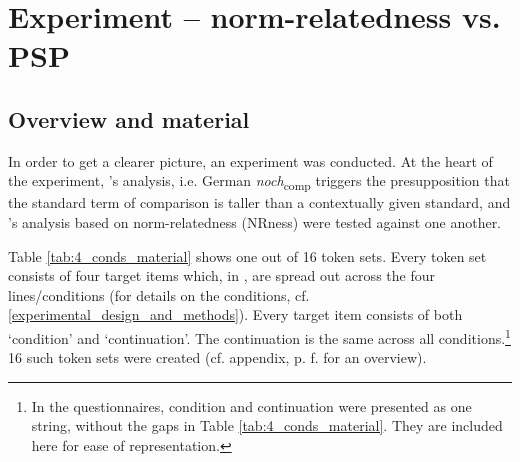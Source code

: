 \documentclass[output=paper,
modfonts
]{langscibook}
\begin{document}
\section{Experiment -- norm-relatedness vs. PSP}\label{sec_experiment}
\subsection{Overview and material}

In order to get a clearer picture, an experiment was conducted. At the heart of the experiment, \citeauthor{Hofstetter2013}'s \citeyearpar{Hofstetter2013} analysis, i.e. German \textit{noch}\textsubscript{comp} triggers the presupposition that the standard term of comparison is taller than a contextually given standard, and \citeauthor{umbach2009a_comp}'s \citeyearpar{umbach2009a_comp} analysis based on norm-relatedness (NRness) were tested against one another.

Table \ref{tab:4_conds_material} shows one out of 16 token sets. Every token set consists of four target items which, in , are spread out across the four lines/conditions (for details on the conditions, cf. \ref{experimental_design_and_methods}). Every target item consists of both `condition' and `continuation'. The continuation is the same across all conditions.\footnote{In the questionnaires, condition and continuation were presented as one string, without the gaps in Table \ref{tab:4_conds_material}. They are included here for ease of representation.} 16 such token sets were created (cf. appendix, p. \pageref{tab:16_contexts}f. for an overview).
\end{document}
